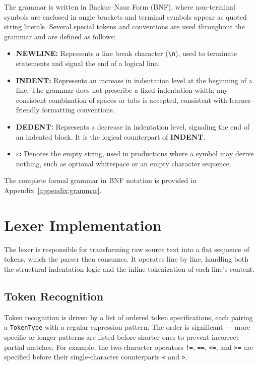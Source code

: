 The grammar is written in Backus--Naur Form (BNF), where non-terminal symbols are enclosed in angle brackets and terminal symbols appear as quoted string literals.
Several special tokens and conventions are used throughout the grammar and are defined as follows:

\begin{itemize}
    \item[\textbf{--}] \textbf{NEWLINE:} Represents a line break character (\texttt{\textbackslash n}), used to terminate statements and signal the end of a logical line.
    \item[\textbf{--}] \textbf{INDENT:} Represents an increase in indentation level at the beginning of a line. The grammar does not prescribe a fixed indentation width; any consistent combination of spaces or tabs is accepted, consistent with learner-friendly formatting conventions.
    \item[\textbf{--}] \textbf{DEDENT:} Represents a decrease in indentation level, signaling the end of an indented block. It is the logical counterpart of \textbf{INDENT}.
    \item[\textbf{--}] \textbf{$\varepsilon$:} Denotes the empty string, used in productions where a symbol may derive nothing, such as optional whitespace or an empty character sequence.
\end{itemize}

The complete formal grammar in BNF notation is provided in Appendix~\ref{appendix:grammar}.

\section{Lexer Implementation}

The lexer is responsible for transforming raw source text into a flat sequence of tokens, which the parser then consumes. It operates line by line, handling both the structural indentation logic and the inline tokenization of each line's content.

\subsection{Token Recognition}

Token recognition is driven by a list of ordered token specifications, each pairing a \texttt{TokenType} with a regular expression pattern. The order is significant --- more specific or longer patterns are listed before shorter ones to prevent incorrect partial matches. For example, the two-character operators \texttt{!=}, \texttt{==}, \texttt{<=}, and \texttt{>=} are specified before their single-character counterparts \texttt{<} and \texttt{>}.

